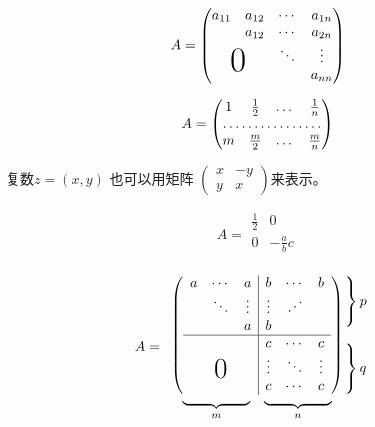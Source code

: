 \documentclass{ctexart}
\newcommand{\adots}{\mathinner{\mkern2mu\raisebox{0.1em}{.}\mkern2mu\raisebox{0.4em}{.}\mkern2mu\raisebox{0.7em}{.}\mkern1mu}}
\begin{document}
	\[
		A = \begin{pmatrix}
			a_{11} & a_{12} & \cdots & a_{1n} \\
			& a_{12} & \cdots & a_{2n} \\
			& & \ddots & \vdots \\
			\multicolumn{2}{c}{\raisebox{1.3ex}[0pt]{\Huge 0}} & & a_{nn}
		\end{pmatrix}
	\]
	
	\[
		A = \begin{pmatrix}
		1 & \frac 12 & \dots & \frac 1n \\
		\hdotsfor{4} \\
		m & \frac{m}{2} & \dots & \frac mn
		\end{pmatrix}
	\]
	
	
	复数$ z = (x,y) $ 也可以用矩阵
	\begin{math}
		\left(  %
		\begin{smallmatrix}
			x & -y \\ y & x
		\end{smallmatrix}
		\right) %
	\end{math}来表示。
	
	\[
		A = \begin{array}{r|r} %
		\frac{1}{2} & 0 \\
		\hline  %
		0 & -\frac abc \\ %
		\end{array}
	\]
	
	\[
		A = \begin{array}{c@{\hspace{-5pt}}l}
			\left(
				\begin{array}{ccc|ccc}
				a & \cdots & a & b & \cdots & b \\
				& \ddots & \vdots & \vdots & \adots \\
				& & a & b \\
				\hline
				& & & c & \cdots & c \\
				& & & \vdots & \ddots & \vdots \\
				\multicolumn{3}{c|}{\raisebox{2ex}[0pt]{\huge 0}} & c & \cdots & c
				\end{array}
			\right)
			&
			\begin{array}{l}
				\left.\rule{0mm}{7mm}\right\}p\\ %
				\\
				\left.\rule{0mm}{7mm}\right\}q   %
			\end{array}
			\\[-5pt]
			\begin{array}{cc}
				\underbrace{\rule{17mm}{0mm}}_m & %
				\underbrace{\rule{17mm}{0mm}}_n   %
			\end{array}
		\end{array}
	\]
	
\end{document}
